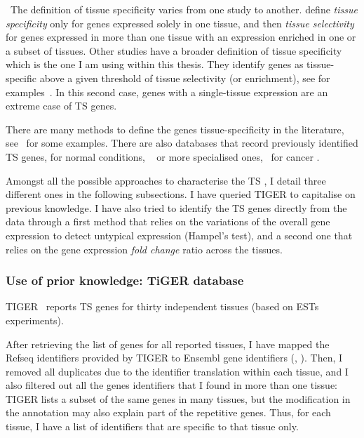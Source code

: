 \NB\ The definition of tissue specificity varies from one study to another.
\cite{Liang2006-mk} define \emph{tissue specificity}
only for genes expressed solely in one tissue,
and then \emph{tissue selectivity} for genes expressed in more than one tissue
with an expression enriched in one or a subset of tissues.
Other studies have a broader definition of tissue specificity
which is the one I am using within this thesis.
They identify genes as tissue-specific above a given threshold
of tissue selectivity (or enrichment),
see for examples~.
In this second case,
genes with a single-tissue expression are an extreme case of \gls{TS} genes.

There are many methods to define the genes tissue-specificity in the literature,
see~
for some examples.
There are also databases that record previously identified \gls{TS} genes,
for normal conditions,
\eg\  or
more specialised ones, \eg\ for cancer
.

Amongst all the possible approaches to characterise the \gls{TS} \pcgs,
I detail three different ones in the following subsections.
I have queried \gls{TIGER} to capitalise on previous knowledge.
I have also tried to identify the \gls{TS} genes directly from the data through
a first method that relies on the variations of the overall gene expression
to detect untypical expression (Hampel's test), and
a second one that relies on the gene expression \emph{fold change} ratio
across the tissues.

\subsubsection{Use of prior knowledge: TiGER database}\label{subsub:Tiger}

\gls{TIGER}~ reports \gls{TS} genes for thirty independent tissues
(based on \glspl{EST} experiments).

After retrieving the list of genes for all reported tissues,
I have mapped the \gls{Refseq} identifiers provided by \gls{TIGER}
to \gls{Ensembl} gene identifiers (, ).
Then, I removed all duplicates due to the identifier translation within each tissue,
and I also filtered out all the genes identifiers that
I found in more than one tissue:
\gls{TIGER} lists a subset of the same genes in many tissues,
but the modification in the annotation may also explain part of the
repetitive genes.
Thus, for each tissue,
I have a list of identifiers that are specific to that tissue only.


